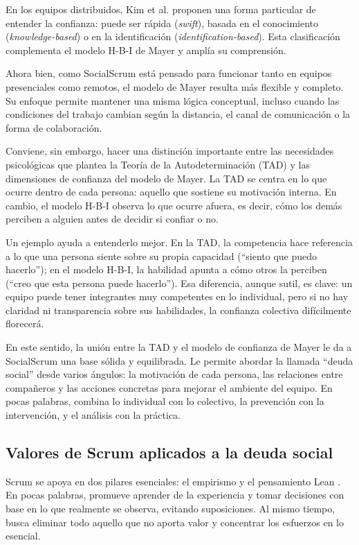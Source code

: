 En los equipos distribuidos, Kim et al. \cite{kim2009individual} proponen una forma particular de entender la confianza: puede ser rápida (\textit{swift}), basada en el conocimiento (\textit{knowledge-based}) o en la identificación (\textit{identification-based}). Esta clasificación complementa el modelo H-B-I de Mayer y amplía su comprensión.

Ahora bien, como SocialScrum está pensado para funcionar tanto en equipos presenciales como remotos, el modelo de Mayer resulta más flexible y completo. Su enfoque permite mantener una misma lógica conceptual, incluso cuando las condiciones del trabajo cambian según la distancia, el canal de comunicación o la forma de colaboración.

Conviene, sin embargo, hacer una distinción importante entre las necesidades psicológicas que plantea la Teoría de la Autodeterminación (TAD) y las dimensiones de confianza del modelo de Mayer. La TAD se centra en lo que ocurre dentro de cada persona: aquello que sostiene su motivación interna. En cambio, el modelo H-B-I observa lo que ocurre afuera, es decir, cómo los demás perciben a alguien antes de decidir si confiar o no.

Un ejemplo ayuda a entenderlo mejor. En la TAD, la competencia hace referencia a lo que una persona siente sobre su propia capacidad (``siento que puedo hacerlo''); en el modelo H-B-I, la habilidad apunta a cómo otros la perciben (``creo que esta persona puede hacerlo''). Esa diferencia, aunque sutil, es clave: un equipo puede tener integrantes muy competentes en lo individual, pero si no hay claridad ni transparencia sobre sus habilidades, la confianza colectiva difícilmente florecerá.

En este sentido, la unión entre la TAD y el modelo de confianza de Mayer le da a SocialScrum una base sólida y equilibrada. Le permite abordar la llamada ``deuda social'' desde varios ángulos: la motivación de cada persona, las relaciones entre compañeros y las acciones concretas para mejorar el ambiente del equipo. En pocas palabras, combina lo individual con lo colectivo, la prevención con la intervención, y el análisis con la práctica.

\subsection{Valores de Scrum aplicados a la deuda social}

Scrum se apoya en dos pilares esenciales: el empirismo y el pensamiento Lean \cite{schwaber2020scrum}. En pocas palabras, promueve aprender de la experiencia y tomar decisiones con base en lo que realmente se observa, evitando suposiciones. Al mismo tiempo, busca eliminar todo aquello que no aporta valor y concentrar los esfuerzos en lo esencial.

